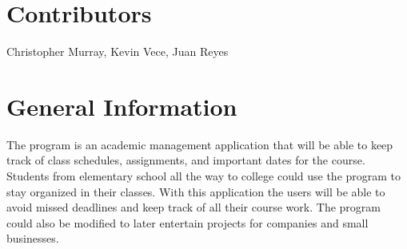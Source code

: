 \hypertarget{index_contributors}{}\section{Contributors}\label{index_contributors}
Christopher Murray, Kevin Vece, Juan Reyes\hypertarget{index_gen_info}{}\section{General Information}\label{index_gen_info}
The program is an academic management application that will be able to keep track of class schedules, assignments, and important dates for the course. Students from elementary school all the way to college could use the program to stay organized in their classes. With this application the users will be able to avoid missed deadlines and keep track of all their course work. The program could also be modified to later entertain projects for companies and small businesses.

